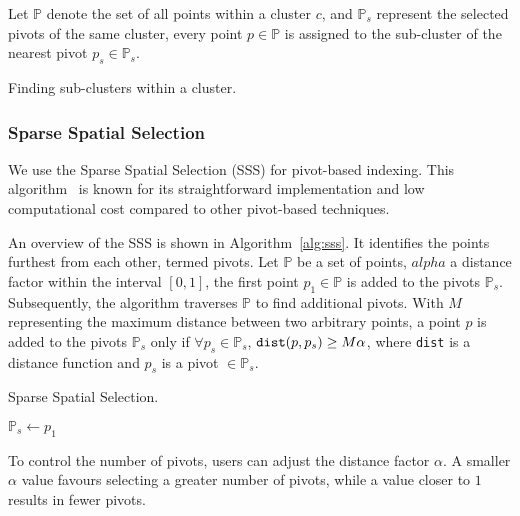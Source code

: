 Let $\mathbb{P}$ denote the set of all points within a cluster $c$, and $\mathbb{P}_s$ represent the selected pivots of the same cluster, every point $p \in \mathbb{P}$ is assigned to the sub-cluster of the nearest pivot $p_s \in \mathbb{P}_s$.

\begin{algorithm}
    \caption{Finding sub-clusters within a cluster.}
    \label{alg:subclustering-finding}
\end{algorithm}

\subsubsection{Sparse Spatial Selection}

We use the Sparse Spatial Selection (SSS) for pivot-based indexing. This algorithm~\cite{pedreira2007} is known for its straightforward implementation and low computational cost compared to other pivot-based techniques. 

An overview of the SSS is shown in Algorithm~\ref{alg:sss}. It identifies the points furthest from each other, termed pivots. Let $\mathbb{P}$ be a set of points, $alpha$ a distance factor within the interval $[0, 1]$, the first point $p_1 \in \mathbb{P}$ is added to the pivots $\mathbb{P}_s$. Subsequently, the algorithm traverses $\mathbb{P}$ to find additional pivots. With $M$ representing the maximum distance between two arbitrary points, a point $p$ is added to the pivots $\mathbb{P}_s$ only if $\forall p_s \in \mathbb{P}_s$, $\verb|dist|(p, p_s) \geq M\alpha$, where \verb|dist| is a distance function and $p_s$ is a pivot $ \in \mathbb{P}_s$.


\begin{algorithm}
    \caption{Sparse Spatial Selection.}
    \label{alg:sss}
        $\mathbb{P}_s \gets {p_1}$\\
\end{algorithm}

To control the number of pivots, users can adjust the distance factor $\alpha$. A smaller $\alpha$ value favours selecting a greater number of pivots, while a value closer to $1$ results in fewer pivots.